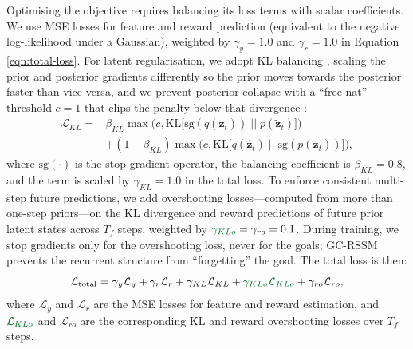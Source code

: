 \documentclass[journal]{IEEEtran}
\newif\ifshowrev\showrevtrue
\newcommand{\rev}[1]{\ifshowrev\textcolor{revblue}{#1}\else#1\fi}
\newif\ifshowirev\showirevtrue
\newcommand{\irev}[1]{\ifshowirev\textcolor{irevgreen}{#1}\else#1\fi}
\begin{document}
\rev{Optimising the objective requires balancing its loss terms with scalar coefficients. We use MSE losses for feature and reward prediction (equivalent to the negative log-likelihood under a Gaussian), weighted by $\gamma_y = 1.0$ and $\gamma_r = 1.0$ in Equation \ref{eqn:total-loss}. For latent regularisation, we adopt KL balancing \cite{hafner2021mastering}, scaling the prior and posterior gradients differently so the prior moves towards the posterior faster than vice versa, and we prevent posterior collapse with a ``free nat'' threshold $c = 1$ that clips the penalty below that divergence \cite{hafner2019learning}:}
\begin{equation}
\begin{aligned}
    \mathcal{L}_{KL} = &\beta_{KL} \max\Big(c, \text{KL}\big[\text{sg}(q(\hat{\bm{z}}_t)) \;\big|\big|\; p(\tilde{\bm{z}}_t)\big]\Big) \\ 
    &+ (1 - \beta_{KL}) \max\Big(c, \text{KL}\big[q(\hat{\bm{z}}_t) \;\big|\big|\; \text{sg}(p(\tilde{\bm{z}}_t))\big]\Big),
\end{aligned} \label{eqn:kl-balance}
\end{equation}
\rev{where $\text{sg}(\cdot)$ is the stop-gradient operator, the balancing coefficient is $\beta_{KL} = 0.8$, and the term is scaled by $\gamma_{KL} = 1.0$ in the total loss. To enforce consistent multi-step future predictions, we add overshooting losses---computed from more than one-step priors---on the KL divergence and reward predictions of future prior latent states across $T_f$ steps, weighted by $\irev{\gamma_{KLo}} = \gamma_{ro} = 0.1$.} \rev{During training, we stop gradients only for the overshooting loss, never for the goals; GC-RSSM prevents the recurrent structure from ``forgetting'' the goal. The total loss is then:}
\begin{equation}
    \mathcal{L}_{\text{total}} = \gamma_y \mathcal{L}_y + \gamma_r \mathcal{L}_r + \gamma_{KL} \mathcal{L}_{KL} + \irev{\gamma_{KLo} \mathcal{L}_{KLo}} + \gamma_{ro} \mathcal{L}_{ro}, \label{eqn:total-loss}
\end{equation}
\rev{where $\mathcal{L}_y$ and $\mathcal{L}_r$ are the MSE losses for feature and reward estimation, and $\irev{\mathcal{L}_{KLo}}$ and $\mathcal{L}_{ro}$ \irev{are the corresponding KL and reward overshooting losses over $T_f$ steps}.}
\end{document}
